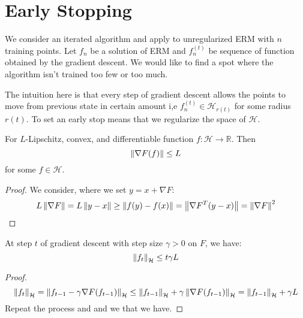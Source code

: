 \section{Early Stopping}
\begin{remark}
    We consider an iterated algorithm and apply to unregularized ERM with $n$ training points. Let $f_n$ be a solution of ERM and $f^{(t)}_n$ be sequence of function obtained by the gradient descent. We would like to find a spot where the algorithm isn't trained too few or too much.
\end{remark}

\begin{remark}
    The intuition here is that every step of gradient descent allows the points to move from previous state in certain amount i,e $f^{(t)}_n \in \mathcal{H}_{r(t)}$ for some radius $r(t)$. To set an early stop means that we regularize the space of $\mathcal{H}$.
\end{remark}

\begin{lemma}
    \label{lem:stability-gd-1}
    For $L$-Lipschitz, convex, and differentiable function $f:\mathcal{H}\rightarrow \mathbb{R}$. Then 
    \begin{equation*}
        \left\lVert\nabla F(f)\right\rVert \le L
    \end{equation*}
    for some $f\in\mathcal{H}$.
\end{lemma}
\begin{proof}
    We consider, where we set $y = x + \nabla F$:
    \begin{equation*}
        L\left\lVert\nabla F\right\rVert = L\left\lVert y - x\right\rVert \ge \left\lVert f(y) - f(x)\right\rVert = \left\lVert\nabla F^T(y - x)\right\rVert = \left\lVert\nabla F\right\rVert^2
    \end{equation*}
\end{proof}

\begin{proposition}
    At step $t$ of gradient descent with step size $\gamma>0$ on $F$, we have:
    \begin{equation*}
        \left\lVert f_t\right\rVert_\mathcal{H} \le t\gamma L
    \end{equation*}
\end{proposition}
\begin{proof}
    \begin{equation*}
        \left\lVert f_t\right\rVert_\mathcal{H} = \left\lVert f_{t-1} - \gamma\nabla F(f_{t-1})\right\rVert_\mathcal{H} \le \left\lVert f_{t-1}\right\rVert_\mathcal{H} + \gamma\left\lVert\nabla F(f_{t-1})\right\rVert_\mathcal{H} = \left\lVert f_{t-1}\right\rVert_\mathcal{H} + \gamma L 
    \end{equation*}
    Repeat the process and and we that we have.
\end{proof}

